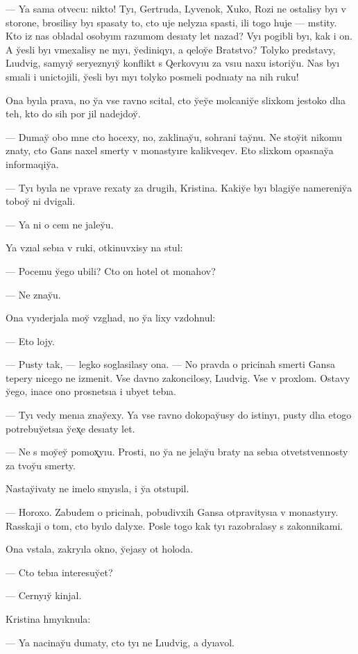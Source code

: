 \documentclass[10pt]{book}
\begin{document}
— Ya sama otvecu: nikto! Tyı, Gertruda, Lyvenok, Xuko, Rozi ne ostalisy byı v storone, brosilisy byı spasaty to, cto uje nelyzıa spasti, ili togo huje — mstity. Kto iz nas obladal osobyım razumom desıaty let nazad? Vyı pogibli byı, kak i on. A y̆esli byı vmexalisy ne myı, y̆ediniqyı, a qeloy̆e Bratstvo? Tolyko predstavy, Lıudvig, samyıy̆ seryeznyıy̆ konflikt s Qerkovyıu za vsıu naxu istoriy̆u. Nas byı smıali i unictojili, y̆esli byı myı tolyko posmeli podnıaty na nih ruku!

Ona byıla prava, no y̆a vse ravno scital, cto y̆ey̆e molcaniy̆e slixkom jestoko dlıa teh, kto do sih por jil nadejdoy̆.

— Dumay̆ obo mne cto hocexy, no, zaklinay̆u, sohrani tay̆nu. Ne stoy̆it nikomu znaty, cto Gans naxel smerty v monastyıre kalikveqev. Eto slixkom opasnay̆a informaqiy̆a.

— Tyı byıla ne vprave rexaty za drugih, Kristina. Kakiy̆e byı blagiy̆e namereniy̆a toboy̆ ni dvigali.

— Ya ni o cem ne jaley̆u.

Ya vzıal sebıa v ruki, otkinuvxisy na stul:

— Pocemu y̆ego ubili? Cto on hotel ot monahov?

— Ne znay̆u.

Ona vyıderjala moy̆ vzglıad, no y̆a lixy vzdohnul:

— Eto lojy.

— Pusty tak, — legko soglasilasy ona. — No pravda o pricinah smerti Gansa tepery nicego ne izmenit. Vse davno zakoncilosy, Lıudvig. Vse v proxlom. Ostavy y̆ego, inace ono prosnetsıa i ubyet tebıa.

— Tyı vedy menıa znay̆exy. Ya vse ravno dokopay̆usy do istinyı, pusty dlıa etogo potrebuy̆etsıa y̆ex̨e desıaty let.

— Ne s moy̆ey̆ pomox̨yıu. Prosti, no y̆a ne jelay̆u braty na sebıa otvetstvennosty za tvoy̆u smerty.

Nastay̆ivaty ne imelo smyısla, i y̆a otstupil.

— Horoxo. Zabudem o pricinah, pobudivxih Gansa otpravitysıa v monastyıry. Rasskaji o tom, cto byılo dalyxe. Posle togo kak tyı razobralasy s zakonnikami.

Ona vstala, zakryıla okno, y̆ejasy ot holoda.

— Cto tebıa interesuy̆et?

— Cernyıy̆ kinjal.

Kristina hmyıknula:

— Ya nacinay̆u dumaty, cto tyı ne Lıudvig, a dyıavol.
\end{document}
